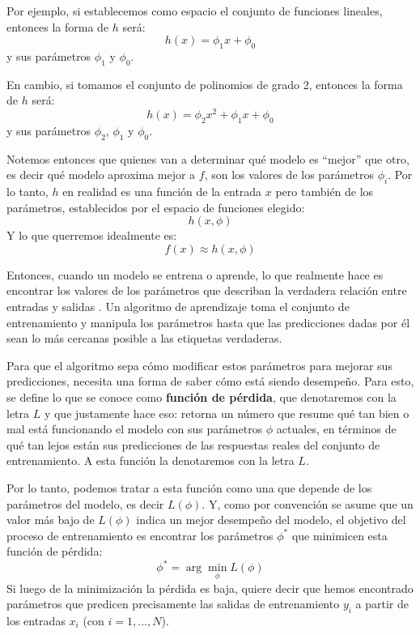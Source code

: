\documentclass[../../main.tex]{subfiles}
\begin{document}
Por ejemplo, si establecemos como espacio el conjunto de funciones lineales, entonces la forma de \(h\) será:
\[h(x) = \phi_1 x + \phi_0\]
y sus parámetros \(\phi_1\) y \(\phi_0\).

En cambio, si tomamos el conjunto de polinomios de grado 2, entonces la forma de \(h\) será:
\[h(x) = \phi_2 x^2 + \phi_1 x + \phi_0\]
y sus parámetros \(\phi_2\), \(\phi_1\) y \(\phi_0\).

Notemos entonces que quienes van a determinar qué modelo es ``mejor'' que otro, es decir qué modelo aproxima mejor a \(f\), son los valores de los parámetros \(\phi_i\). Por lo tanto, \(h\) en realidad es una función de la entrada \(x\) pero también de los parámetros, establecidos por el espacio de funciones elegido:
\[h(x, \phi)\]
Y lo que querremos idealmente es:
\[f(x) \approx h(x, \phi)\]

Entonces, cuando un modelo se entrena o aprende, lo que realmente hace es encontrar los valores de los parámetros que describan la verdadera relación entre entradas y salidas \cite{prince2024understanding}. Un algoritmo de aprendizaje toma el conjunto de entrenamiento y manipula los parámetros hasta que las predicciones dadas por él sean lo más cercanas posible a las etiquetas verdaderas.

Para que el algoritmo sepa cómo modificar estos parámetros para mejorar sus predicciones, necesita una forma de saber cómo está siendo desempeño. Para esto, se define lo que se conoce como \textbf{función de pérdida}, que denotaremos con la letra \(L\) y que justamente hace eso: retorna un número que resume qué tan bien o mal está funcionando el modelo con sus parámetros \(\phi\) actuales, en términos de qué tan lejos están sus predicciones de las respuestas reales del conjunto de entrenamiento. A esta función la denotaremos con la letra \(L\).

Por lo tanto, podemos tratar a esta función como una que depende de los parámetros del modelo, es decir \(L(\phi)\). Y, como por convención se asume que un valor más bajo de \(L(\phi)\) indica un mejor desempeño del modelo, el objetivo del proceso de entrenamiento es encontrar los parámetros \(\phi^*\) que minimicen esta función de pérdida:
\[
\phi^* = \arg\min_{\phi} L(\phi)
\]
Si luego de la minimización la pérdida es baja, quiere decir que hemos encontrado parámetros que predicen precisamente las salidas de entrenamiento \(y_i\) a partir de los entradas \(x_i\) (con \(i=1,...,N\)).

\end{document}
